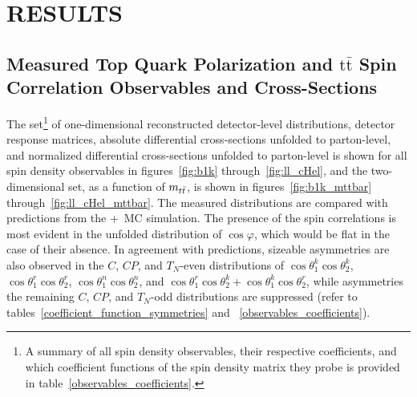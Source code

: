 
\chapter{RESULTS}
\label{Results}



\section{Measured Top Quark Polarization and \ensuremath{\mathrm{t\bar{t}}} Spin Correlation Observables and Cross-Sections}
The set\footnote{A summary of all spin density observables, their respective coefficients, and which coefficient functions of the spin density matrix they probe is provided in table~\ref{observables_coefficients}.} of one-dimensional reconstructed detector-level distributions, detector response matrices, absolute differential cross-sections unfolded to parton-level, and normalized differential cross-sections unfolded to parton-level is shown for all spin density observables in figures~\ref{fig:b1k} through~\ref{fig:ll_cHel}, and the two-dimensional set, as a function of $m_{t\bar{t}}$, is shown in figures~\ref{fig:b1k_mttbar} through~\ref{fig:ll_cHel_mttbar}.
The measured distributions are compared with predictions from the \Powheg+\Pythia\ MC simulation.
The presence of the spin correlations is most evident in the unfolded distribution of $\cos\varphi$, which would be flat in the case of their absence.
In agreement with predictions, sizeable asymmetries are also observed in the $C$, $CP$, and $T_N$-even distributions of $\cos\theta_{1}^{k}\cos\theta_{2}^{k}$, $\cos\theta_{1}^{r}\cos\theta_{2}^{r}$, $\cos\theta_{1}^{n}\cos\theta_{2}^{n}$, and $\cos\theta_{1}^{r}\cos\theta_{2}^{k}+\cos\theta_{1}^{k}\cos\theta_{2}^{r}$, while asymmetries the remaining $C$, $CP$, and $T_N$-odd distributions are suppressed (refer to tables~\ref{coefficient_function_symmetries} and ~\ref{observables_coefficients}).

